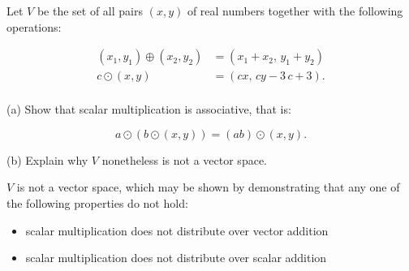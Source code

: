 
\begin{exerciseStatement}


 Let \(V\) be the set of all pairs \((x,y)\) of real numbers together with the following operations: 


\begin{align*} (x_1,y_1)\oplus (x_2,y_2)&= \left(x_{1} + x_{2},\,y_{1} + y_{2}\right)  \\c \odot (x,y) &= \left(c x,\,c y - 3 \, c + 3\right) . \\ \end{align*}
            

 (a) Show that scalar multiplication is associative, that is: 

\[a\odot(b\odot (x,y))=(ab)\odot(x,y).
    \]

 (b) Explain why \(V\) nonetheless is not a vector space. 


\end{exerciseStatement}
    
\begin{exerciseAnswer} 


\(V\) is not a vector space, which may be shown by demonstrating that any one of the following properties do not hold: 


\begin{itemize}
\item scalar multiplication does not distribute over vector addition
\item scalar multiplication does not distribute over scalar addition
\end{itemize}
    
\end{exerciseAnswer}
    
